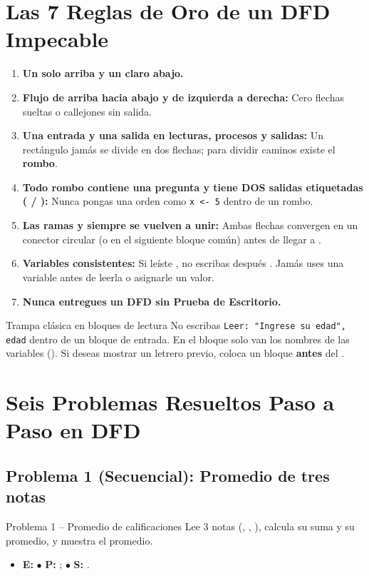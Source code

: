 \documentclass[11pt,letterpaper]{article}
\begin{document}
\section{Las 7 Reglas de Oro de un DFD Impecable}

\begin{enumerate}
  \item \textbf{Un solo  arriba y un  claro abajo.}
  \item \textbf{Flujo de arriba hacia abajo y de izquierda a derecha:} Cero flechas sueltas o callejones sin salida.
  \item \textbf{Una entrada y una salida en lecturas, procesos y salidas:} Un rectángulo jamás se divide en dos flechas; para dividir caminos existe el \textbf{rombo}.
  \item \textbf{Todo rombo contiene una pregunta y tiene DOS salidas etiquetadas ( / ):} Nunca pongas una orden como \texttt{x <- 5} dentro de un rombo.
  \item \textbf{Las ramas  y  siempre se vuelven a unir:} Ambas flechas convergen en un conector circular (o en el siguiente bloque común) antes de llegar a .
  \item \textbf{Variables consistentes:} Si leíste , no escribas después . Jamás uses una variable antes de leerla o asignarle un valor.
  \item \textbf{Nunca entregues un DFD sin Prueba de Escritorio.}
\end{enumerate}

\begin{peligro}{Trampa clásica en bloques de lectura}
No escribas \texttt{Leer: "Ingrese su edad", edad} dentro de un bloque de entrada. En el bloque  solo van los nombres de las variables (). Si deseas mostrar un letrero previo, coloca un bloque  \textbf{antes} del .
\end{peligro}

\section{Seis Problemas Resueltos Paso a Paso en DFD}

\subsection{Problema 1 (Secuencial): Promedio de tres notas}
\begin{analisis}{Problema 1 -- Promedio de calificaciones}
Lee 3 notas (, , ), calcula su suma y su promedio, y muestra el promedio.
\begin{itemize}
  \item \textbf{E:}  \quad $\bullet$ \textbf{P:} ;  \quad $\bullet$ \textbf{S:} .
\end{itemize}
\end{analisis}
\end{document}
